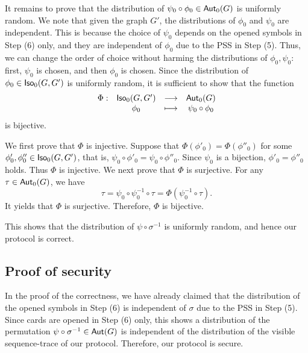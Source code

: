 It remains to prove that the distribution of $\psi_0\circ\phi_0 \in \mathsf{Aut}_0(G)$ is uniformly random. 
We note that given the graph $G'$, the distributions of $\phi_0$ and $\psi_0$ are independent. 
This is because the choice of $\psi_0$ depends on the opened symbols in Step (6) only, and they are independent of $\phi_0$ due to the PSS in Step (5). 
Thus, we can change the order of choice without harming the distributions of $\phi_0, \psi_0$: first, $\psi_0$ is chosen, and then $\phi_0$ is chosen. 
Since the distribution of $\phi_0 \in \mathsf{Iso}_0(G, G')$ is uniformly random, it is sufficient to show that the function
\[ 
\begin{array}{cccc}
\Phi:  & \mathsf{Iso}_0(G, G') &  \longrightarrow &  \mathsf{Aut}_0(G) \\
           & \phi_0                                                    & \longmapsto & \psi_0 \circ\phi_0
 \end{array}
 \]
is bijective. 

We first prove that $\Phi$ is injective. 
Suppose that $\Phi(\phi'_0) = \Phi(\phi''_0)$ for some $\phi'_0, \phi''_0 \in \mathsf{Iso}_0(G, G')$, that is,  $\psi_0 \circ\phi'_0 = \psi_0 \circ\phi''_0$. 
Since $\psi_0$ is a bijection, $\phi'_0 = \phi''_0$ holds.
Thus $\Phi$ is injective. 
We next prove that $\Phi$ is surjective. 
For any $\tau\in\mathsf{Aut}_0(G)$, we have 
\[ \tau = \psi_0\circ\psi_0^{-1}\circ \tau = \Phi (\psi_0^{-1}\circ \tau). \] 
It yields that $\Phi$ is surjective. 
Therefore, $\Phi$ is bijective. 

This shows that the distribution of $\psi \circ \sigma^{-1}$ is uniformly random, and hence our protocol is correct. 


\subsection{Proof of security}

In the proof of the correctness, we have already claimed that the distribution of the opened symbols in Step (6) is independent of $\sigma$ due to the PSS in Step (5). 
Since cards are opened in Step (6) only, this shows a distribution of the permutation $\psi\circ \sigma^{-1} \in \mathsf{Aut}(G)$ is independent of the distribution of the visible sequence-trace of our protocol. 
Therefore, our protocol is secure. 

